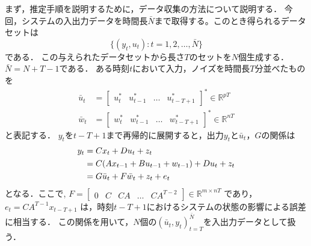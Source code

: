 まず，推定手順を説明するために，データ収集の方法について説明する．
今回，システムの入出力データを時間長$\bar{N}$まで取得する。このとき得られるデータセットは  
\begin{equation*}
    \{(y_t, u_t):t = 1, 2, \ldots,  \bar{N} \}
\end{equation*}
である．
この与えられたデータセットから長さ$T$のセットを$N$個生成する．
$\bar{N} = N + T - 1$である．
ある時刻$t$において入力，ノイズを時間長$T$分並べたものを
\begin{align}
    \bar{u}_t &= 
    \begin{bmatrix}
        u_t^* & u_{t-1}^* & \ldots & u_{t-T+1}^*
    \end{bmatrix}^*
    \in \mathbb{R}^{pT}
    \\
    \bar{w}_t &= 
    \begin{bmatrix}
        w_t^* & w_{t-1}^* & \ldots & w_{t-T+1}^*
    \end{bmatrix}^*
    \in \mathbb{R}^{nT}
\end{align}
と表記する．
$y_t$を$t-T+1$まで再帰的に展開すると，出力$y_t$と$\bar{u}_t$，$G$の関係は
\begin{align}
    y_t &= Cx_t + Du_t + z_t \notag \\
        &= C(Ax_{t-1} + Bu_{t-1} + w_{t-1}) + Du_t + z_t \notag  \\
        \label{u_y}
        &= G\bar{u}_t + F\bar{w}_t + z_t + e_t 
\end{align}
となる．ここで,
$F = 
\begin{bmatrix}
    0 & C & CA & \ldots & CA^{T-2}
\end{bmatrix}\in \mathbb{R}^{m \times nT}$
であり，
$e_t = CA^{T-1}x_{t-T+1}$
は，時刻$t-T+1$におけるシステムの状態の影響による誤差に相当する．
この関係を用いて，$N$個の$(\bar{u}_t, y_t)_{t = T}^{\bar{N}}$を入出力データとして扱う．


